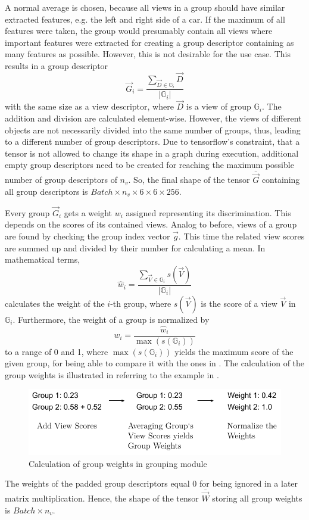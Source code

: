 A normal average is chosen, because all views in a group should have similar extracted features, e.g. the left and right side of a car.
If the maximum of all features were taken, the group would presumably contain all views where important features were extracted for creating a group descriptor containing as many features as possible.
However, this is not desirable for the use case.
This results in a group descriptor
\begin{equation}
	\vec{G}_i = \frac{\sum_{\vec{D} \in \mathbb{G}_i} \vec{D}}{|\mathbb{G}_i|}
\end{equation}
with the same size as a view descriptor, where $\vec{D}$ is a view of group $\mathbb{G}_i$. The addition and division are calculated element-wise.
However, the views of different objects are not necessarily divided into the same number of groups, thus, leading to a different number of group descriptors.
Due to tensorflow's constraint, that a tensor is not allowed to change its shape in a graph during execution, additional empty group descriptors need to be created for reaching the maximum possible number of group descriptors of $n_v$.
So, the final shape of the tensor $\bar{\vec{G}}$ containing all group descriptors is $Batch \times n_v \times 6 \times 6 \times 256$.

Every group $\vec{G}_i$ gets a weight $w_i$ assigned representing its discrimination.
This depends on the scores of its contained views.
Analog to before, views of a group are found by checking the group index vector $\vec{g}$.
This time the related view scores are summed up and divided by their number for calculating a mean.
In mathematical terms,
\begin{equation}
	\hat{w}_i = \frac{\sum_{\vec{V} \in \mathbb{G}_i} s(\vec{V})}{|\mathbb{G}_i|}
\end{equation}
calculates the weight of the $i$-th group, where $s(\vec{V})$ is the score of a view $\vec{V}$ in $\mathbb{G}_i$.
Furthermore, the weight of a group is normalized by
\begin{equation}
	w_i = \frac{\hat{w}_i}{\max(s(\mathbb{G}_i))}
\end{equation}
to a range of 0 and 1, where $\max(s(\mathbb{G}_i))$ yields the maximum score of the given group, for being able to compare it with the ones in \cite{Feng2018}.
The calculation of the group weights is illustrated in  referring to the example in .
\begin{figure}
	\centering
	\includegraphics[]{images/grouping_module_weights.pdf}
	\caption{Calculation of group weights in grouping module}
	\label{fig:grouping-module-weights}
\end{figure}
The weights of the padded group descriptors equal 0 for being ignored in a later matrix multiplication.
Hence, the shape of the tensor $\bar{\vec{W}}$ storing all group weights is $Batch \times n_v$.